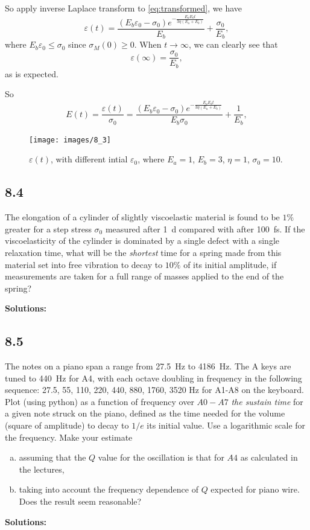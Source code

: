 \documentclass[12pt]{article}
\begin{document}
So apply inverse Laplace transform to \eqref{eq:transformed}, we have
\begin{equation}
  \varepsilon(t) = \frac{(E_b \varepsilon_0-\sigma_0) e^{-\frac{E_a E_b t}{3 \eta (E_a + E_b)}}}{E_b}+\frac{\sigma_0}{E_b},
\end{equation}
where $E_b \varepsilon_0 \leq \sigma_0$ since $\sigma_M(0) \geq 0$.
When $t \rightarrow \infty$, we can clearly see that
\begin{equation}
  \varepsilon(\infty) = \frac{\sigma_0}{E_b},
\end{equation}
as is expected.

So
\begin{equation}
  E(t) = \frac{ \varepsilon(t) }{ \sigma_0 } = \frac{(E_b \varepsilon_0-\sigma_0) e^{-\frac{E_a E_b t}{3 \eta (E_a + E_b)}}}{E_b \sigma_0}+\frac{1}{E_b},
\end{equation}
\begin{figure}[h]
  \centering
  \texttt{[image: images/8\_3]}
  \caption{$\varepsilon(t)$, with different intial $\varepsilon_0$, where $E_a = 1$, $E_b = 3$, $\eta = 1$, $\sigma_0 = 10$.}
  \label{fig:question_8_3}
\end{figure}

\subsection{8.4}
The elongation of a cylinder of slightly viscoelastic material is found to be
$1\%$ greater for a step stress $\sigma_0$ measured after \SI{1}{\day} compared with after \SI{100}{\femto\second}.
If the viscoelasticity of the cylinder is dominated by a single defect
with a single relaxation time, what will be the \emph{shortest} time for a spring made from this
material set into free vibration to decay to $10\%$ of its initial amplitude,
if measurements are taken for a full range of masses applied to the end of the spring?

\textbf{Solutions:}

\subsection{8.5}
The notes on a piano span a range from \SI{27.5}{\hertz} to \SI{4186}{\hertz}.
The A keys are tuned to \SI{440}{\hertz} for A4, with each octave doubling in frequency
in the following sequence: 27.5, 55, 110, 220, 440, 880, 1760, 3520 Hz for A1-A8 on
the keyboard.  Plot (using python) as a function of frequency over $A0-A7$ \emph{the sustain time}
for a given note struck on the piano, defined as the time needed for the volume (square of amplitude)
to decay to $1/e$ its initial value.  Use a logarithmic scale for the frequency. Make your estimate
\begin{enumerate}[a)]
  \item assuming that the $Q$ value for the oscillation is that for $A4$ as calculated in the lectures,
  \item taking into account the frequency dependence of $Q$ expected for piano wire. Does the result seem reasonable?
\end{enumerate}

\textbf{Solutions:}

% 
% 

\end{document}
